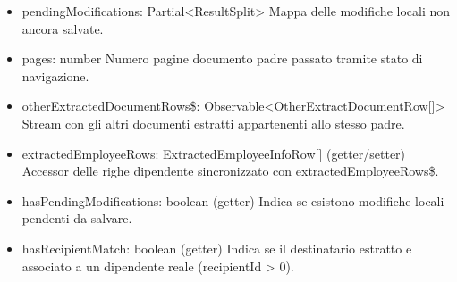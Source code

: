 \documentclass[a4paper,11pt]{article}
\begin{document}
\begin{itemize}[noitemsep, topsep=0pt]
\item pendingModifications: Partial<ResultSplit>
Mappa delle modifiche locali non ancora salvate.

\item pages: number
Numero pagine documento padre passato tramite stato di navigazione.

\item otherExtractedDocumentRows\$: Observable<OtherExtractDocumentRow[]>
Stream con gli altri documenti estratti appartenenti allo stesso padre.

\item extractedEmployeeRows: ExtractedEmployeeInfoRow[] (getter/setter)
Accessor delle righe dipendente sincronizzato con extractedEmployeeRows\$.

\item hasPendingModifications: boolean (getter)
Indica se esistono modifiche locali pendenti da salvare.

\item hasRecipientMatch: boolean (getter)
Indica se il destinatario estratto e associato a un dipendente reale (recipientId > 0).
\end{itemize}
\end{document}
